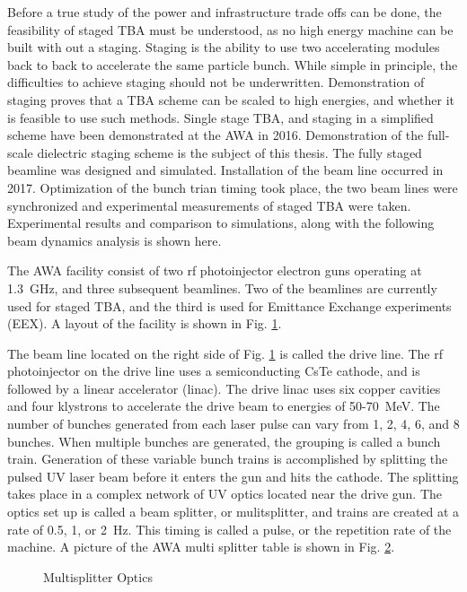 \documentclass{iitthesis}
\newcommand{\lsnote}[1]{\textsf{{\color{violet}{ LS note:}   #1 }}}
\begin{document}
Before a true study of the power and infrastructure trade offs 
can be done, the feasibility of staged TBA must be understood, 
as no high energy machine can be built with out a staging.
Staging is the ability to use two accelerating modules back to back to accelerate 
the same particle bunch. While simple in principle, the difficulties 
to achieve staging should not be underwritten. Demonstration of staging proves 
that a TBA scheme can be scaled to high energies, and whether it is 
feasible to use such methods. Single stage TBA, and staging 
in a simplified scheme have been demonstrated at the AWA in 2016. 
Demonstration of the full-scale dielectric staging scheme is the 
subject of this thesis. The fully staged beamline was designed and 
simulated. Installation of the beam line occurred in 2017.
Optimization of the bunch trian timing took place, the two 
beam lines were synchronized and experimental measurements 
of staged TBA were taken. 
Experimental results and comparison to simulations, along 
with the following beam dynamics analysis is shown here.


The AWA facility consist of two rf photoinjector electron guns operating
at \SI{1.3}{GHz}, and three subsequent beamlines. %
Two of the beamlines are currently used for staged TBA, and the
third is used for Emittance Exchange experiments (EEX). A layout of
the facility is shown in Fig. \ref{fig:bunker}. 

The beam line located on the right side of Fig. \ref{fig:bunker} is called the
drive line. The rf photoinjector on the drive line uses a semiconducting
CsTe cathode, and is followed by a linear accelerator (linac). The
drive linac uses six copper cavities and four klystrons to accelerate the drive beam
to energies of 50-\SI{70}{MeV}. The number of bunches generated from each 
laser pulse can vary from 1, 2, 4, 6, and 8 bunches. When multiple bunches
are generated, the grouping is called a bunch train. Generation of
these variable bunch trains is accomplished by splitting the pulsed
UV laser beam before it enters the gun and hits the cathode. The splitting
takes place in a complex network of UV optics located near the drive
gun. The optics set up is called a beam splitter, or mulitsplitter,
and trains are created at a rate of 0.5, 1, or \SI{2}{Hz}. This timing is
called a pulse, or the repetition rate of the machine. A picture of
the AWA multi splitter table is shown in Fig. \ref{fig:optics}. 
\begin{figure}
	\begin{center}
		\label{fig:bunker}
	\end{center}
\end{figure}
\begin{figure}
	\begin{center}
		\caption{Multisplitter Optics}
		\label{fig:optics}
	\end{center}
\end{figure}
\end{document}
